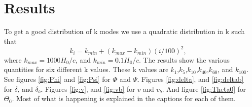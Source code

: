 \documentclass[a4paper]{report}
\begin{document}
\section{Results}\label{sec:results}
To get a good distribution of k modes we use a quadratic distribution in k such that
\begin{equation}
 k_i = k_{min} +(k_{max}-k_{min})(i/100)^2,
\end{equation}
where $k_{max} = 1000H_0/c$, and $k_{min} = 0.1H_0/c$.
The results show the various quantities for six different k values. These k values are $k_1$,$k_5$,$k_{10}$,$k_{40}$,$k_{60}$, and $k_{100}$. See figures \ref{fig:Phi} and \ref{fig:Psi} for $\Phi$ and $\Psi$. Figures \ref{fig:delta}, and \ref{fig:deltab} for $\delta$, and $\delta_b$. Figures \ref{fig:v}, and \ref{fig:vb} for $v$ and $v_b$. And figure \ref{fig:Theta0} for $\Theta_0$. Most of what is happening is explained in the captions for each of them.
\end{document}
